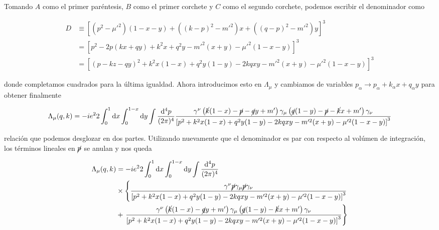 \documentclass{article}
\numberwithin{equation}{section}
\begin{document}
Tomando $ A $ como el primer paréntesis, $ B $ como el primer corchete y $ C $ como el segundo corchete, podemos escribir el denominador como

\begin{equation}\label{key}
\begin{aligned}
D &\equiv \left[(p^2-\mu'^2)(1-x-y) + ((k-p)^2-m'^2)x + ((q-p)^2-m'^2)y\right]^3\\
&= \left[p^2 -2p(kx+qy) + k^2x +q^2y -m'^2(x+y) -\mu'^2(1-x-y)\right]^3\\
&=\left[(p-kz-qy)^2 + k^2x(1-x) +q^2y(1-y) -2kqxy -m'^2(x+y) -\mu'^2(1-x-y)\right]^3
\end{aligned}
\end{equation}

donde completamos cuadrados para la última igualdad. Ahora introducimos esto en $ \Lambda_{\mu} $ y cambiamos de variables $ p_{\alpha} \longrightarrow p_{\alpha} + k_{\alpha}x + q_{\alpha}y $ para obtener finalmente

\begin{equation}
\Lambda_{\mu}(q,k)=-ie^22\int_0^1\mathrm{d}x\int_0^{1-x}\mathrm{d}y \int \frac{\mathrm{d^4}p}{(2\pi)^4} \frac{  \gamma^{\nu}\left(\cancel{k}(1-x)-\cancel{p} -\cancel{q}y+m'\right)\gamma_{\mu}\left( \cancel{q}(1-y)-\cancel{p} -\cancel{k}x +m'\right)\gamma_{\nu}}{\left[p^2 + k^2x(1-x) +q^2y(1-y) -2kqxy -m'^2(x+y) -\mu'^2(1-x-y)\right]^3}
\end{equation}

relación que podemos desglozar en dos partes. Utilizando nuevamente que el denominador es par con respecto al volúmen de integración, los términos lineales en $ \cancel{p} $ se anulan y nos queda


\begin{boxquation}
\begin{equation}\label{lambda}
\begin{aligned}
\Lambda_{\mu}(q,k)&=-ie^22\int_0^1\mathrm{d}x\int_0^{1-x}\mathrm{d}y \int \frac{\mathrm{d^4}p}{(2\pi)^4}\\
&\times \left\{ \frac{  \gamma^{\nu}\cancel{p}\gamma_{\mu}\cancel{p}\gamma_{\nu}}{\left[p^2 + k^2x(1-x) +q^2y(1-y) -2kqxy -m'^2(x+y) -\mu'^2(1-x-y)\right]^3} \right.\\
&+ \left. \frac{  \gamma^{\nu}\left(\cancel{k}(1-x) -\cancel{q}y+m'\right)\gamma_{\mu}\left( \cancel{q}(1-y) -\cancel{k}x +m'\right)\gamma_{\nu}}{\left[p^2 + k^2x(1-x) +q^2y(1-y) -2kqxy -m'^2(x+y) -\mu'^2(1-x-y)\right]^3} \right\}\\
\end{aligned}
\end{equation}
\end{boxquation}
\end{document}
